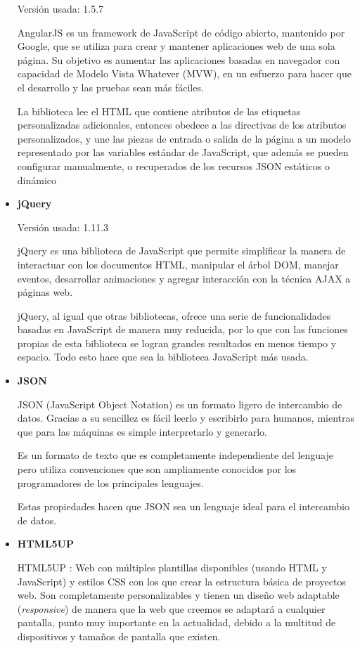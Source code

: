 \begin{itemize}
	Versión usada: 1.5.7
		
	AngularJS \cite{angularjs} es un framework de JavaScript de código abierto, mantenido por Google, que se utiliza para crear y mantener aplicaciones web de una sola página. Su objetivo es aumentar las aplicaciones basadas en navegador con capacidad de Modelo Vista Whatever (MVW), en un esfuerzo para hacer que el desarrollo y las pruebas sean más fáciles.

	La biblioteca lee el HTML que contiene atributos de las etiquetas personalizadas adicionales, entonces obedece a las directivas de los atributos personalizados, y une las piezas de entrada o salida de la página a un modelo representado por las variables estándar de JavaScript, que además se pueden configurar manualmente, o recuperados de los recursos JSON estáticos o dinámico


	\bigskip	
	\item \textbf{jQuery}
	
	Versión usada: 1.11.3
		
	jQuery \cite{jquery} es una biblioteca de JavaScript que permite simplificar la manera de interactuar con los documentos HTML, manipular el árbol DOM, manejar eventos, desarrollar animaciones y agregar interacción con la técnica AJAX a páginas web.

	jQuery, al igual que otras bibliotecas, ofrece una serie de funcionalidades basadas en JavaScript de manera muy reducida, por lo que con las funciones propias de esta biblioteca se logran grandes resultados en menos tiempo y espacio. Todo esto hace que sea la biblioteca JavaScript más usada.
		

	\bigskip	
	\item \textbf{JSON}
		
	JSON (JavaScript Object Notation) \cite{json} es un formato ligero de intercambio de datos. Gracias a su sencillez es fácil leerlo y escribirlo para humanos, mientras que para las máquinas es simple interpretarlo y generarlo.
	
	Es un formato de texto que es completamente independiente del lenguaje pero utiliza convenciones que son ampliamente conocidos por los programadores de los principales lenguajes. 
	
	Estas propiedades hacen que JSON sea un lenguaje ideal para el intercambio de datos.


	\bigskip
	\item \textbf{HTML5UP}
		
	HTML5UP \cite{htmlup}: Web con múltiples plantillas disponibles (usando HTML y JavaScript) y estilos CSS con los que crear la estructura básica de proyectos web. Son completamente personalizables y	tienen un diseño web adaptable (\textit{responsive}) de manera que la web que creemos se adaptará a cualquier pantalla, punto muy importante en la actualidad, debido a la multitud de dispositivos y tamaños de pantalla que existen.

		
\end{itemize}
	
